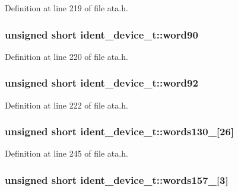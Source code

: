 Definition at line 219 of file ata.\+h.

\subsubsection[{\texorpdfstring{word90}{word90}}]{\setlength{\rightskip}{0pt plus 5cm}unsigned short ident\+\_\+device\+\_\+t\+::word90}\hypertarget{structident__device__t_aecb00df2d3c8414264a12b6ddb8afcb8}{}\label{structident__device__t_aecb00df2d3c8414264a12b6ddb8afcb8}


Definition at line 220 of file ata.\+h.

\subsubsection[{\texorpdfstring{word92}{word92}}]{\setlength{\rightskip}{0pt plus 5cm}unsigned short ident\+\_\+device\+\_\+t\+::word92}\hypertarget{structident__device__t_a8ec1dbaa797ef886e2c7ba8b4940f442}{}\label{structident__device__t_a8ec1dbaa797ef886e2c7ba8b4940f442}


Definition at line 222 of file ata.\+h.

\subsubsection[{\texorpdfstring{words130\+\_\+155}{words130_155}}]{\setlength{\rightskip}{0pt plus 5cm}unsigned short ident\+\_\+device\+\_\+t\+::words130\+\_\mbox{[}26\mbox{]}}\hypertarget{structident__device__t_a663ba0f8b9d12f16691962d97e269d22}{}\label{structident__device__t_a663ba0f8b9d12f16691962d97e269d22}


Definition at line 245 of file ata.\+h.

\subsubsection[{\texorpdfstring{words157\+\_\+159}{words157_159}}]{\setlength{\rightskip}{0pt plus 5cm}unsigned short ident\+\_\+device\+\_\+t\+::words157\+\_\mbox{[}3\mbox{]}}\hypertarget{structident__device__t_a3be0642d7da6a8ba1cc4e4efe30e4058}{}\label{structident__device__t_a3be0642d7da6a8ba1cc4e4efe30e4058}


